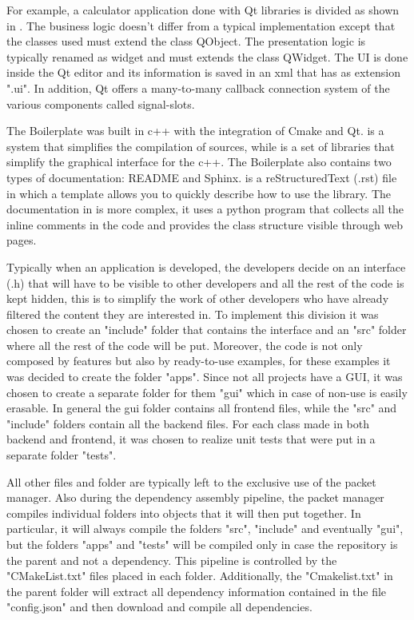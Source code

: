 For example, a calculator application done with Qt libraries is divided as shown in . The business logic doesn't differ from a typical implementation except that the classes used must extend the class QObject. The presentation logic is typically renamed as widget and must extends the class QWidget. The UI is done inside the Qt editor and its information is saved in an xml that has as extension ".ui". In addition, Qt offers a many-to-many callback connection system of the various components called signal-slots.


The Boilerplate was built in c++ with the integration of Cmake and Qt.
 is a system that simplifies the compilation of sources, while  is a set of libraries that simplify the graphical interface for the c++. The Boilerplate also contains two types of documentation: README and Sphinx.
 is a reStructuredText (.rst) file in which a template allows you to quickly describe how to use the library.
The documentation in  is more complex, it uses a python program that collects all the inline comments in the code and provides the class structure visible through web pages.

Typically when an application is developed, the developers decide on an interface (.h) that will have to be visible to other developers and all the rest of the code is kept hidden, this is to simplify the work of other developers who have already filtered the content they are interested in.
To implement this division it was chosen to create an "include" folder that contains the interface and an "src" folder where all the rest of the code will be put.
Moreover, the code is not only composed by features but also by ready-to-use examples, for these examples it was decided to create the folder "apps".
Since not all projects have a GUI, it was chosen to create a separate folder for them "gui" which in case of non-use is easily erasable.
In general the gui folder contains all frontend files, while the "src" and "include" folders contain all the backend files.
For each class made in both backend and frontend, it was chosen to realize unit tests that were put in a separate folder "tests".

All other files and folder are typically left to the exclusive use of the packet manager.
Also during the dependency assembly pipeline, the packet manager compiles individual folders into objects that it will then put together. In particular, it will always compile the folders "src", "include" and eventually "gui", but the folders "apps" and "tests" will be compiled only in case the repository is the parent and not a dependency. This pipeline is controlled by the "CMakeList.txt" files placed in each folder.
Additionally, the "Cmakelist.txt" in the parent folder will extract all dependency information contained in the file "config.json" and then download and compile all dependencies.

